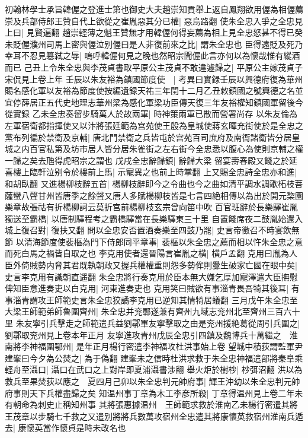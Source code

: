 初翰林學士承旨韓偓之登進士第也御史大夫趙崇知貢舉上返自鳳翔欲用偓為相偓薦崇及兵部侍郎王贊自代上欲從之崔胤惡其分已權|{
	惡烏路翻}
使朱全忠入爭之全忠見上曰|{
	見賢遍翻}
趙崇輕薄之魁王贊無才用韓偓何得妄薦為相上見全忠怒甚不得已癸未貶偓濮州司馬上密與偓泣别偓曰是人非復前來之比|{
	謂朱全忠也}
臣得遠貶及死乃幸耳不忍見簒弑之辱|{
	嗚呼韓偓何見之晚也然昭宗聞偓此言亦何以為懷哉惟有縱酒而已}
己丑上令朱全忠與李茂貞書取平原公主茂貞不敢違遽歸之|{
	平原公主嫁茂貞子宋侃見上卷上年}
壬辰以朱友裕為鎮國節度使　|{
	考異曰實録壬辰以興德府復為華州賜名感化軍以友裕為節度使按編遺録天祐三年閏十二月乙丑敕鎮國之號興德之名並宜停薛居正五代史地理志華州梁為感化軍梁功臣傳天復三年友裕權知鎮國軍留後今從實録}
乙未全忠奏留步騎萬人於故兩軍|{
	時神策兩軍已散而營署尚存}
以朱友倫為左軍宿衛都指揮使又以汴將張廷範為宫苑使王殷為皇城使蔣玄暉充街使於是全忠之黨布列徧於禁衛及京輔|{
	唐北門禁衛之兵皆屯於宫苑百司庶府及南衙諸衛皆分居皇城之内百官私第及坊市居人皆分居朱雀街之左右街今全忠悉以腹心為使則京輔之權一歸之矣去虺得虎昭宗之謂也}
戊戌全忠辭歸鎮|{
	辭歸大梁}
留宴壽春殿又餞之於延喜樓上臨軒泣别令於樓前上馬|{
	示寵異之也前上時掌翻}
上又賜全忠詩全忠亦和進|{
	和胡臥翻}
又進楊柳枝辭五首|{
	楊柳枝辭即今之令曲也今之曲如清平調水調歌柘枝菩薩蠻八聲甘州皆唐季之餘聲又唐人多賦楊柳枝皆是七言四絶相傳以為出於開元棃園樂章故張祜有折楊柳詞云莫折宫前楊柳枝玄宗曾向笛中吹}
百官班辭於長樂驛崔胤獨送至霸橋|{
	以唐制驛程考之霸橋驛當在長樂驛東三十里}
自置餞席夜二鼓胤始還入城上復召對|{
	復扶又翻}
問以全忠安否置酒奏樂至四鼓乃罷|{
	史言帝徵召不時宴飲無節}
以清海節度使裴樞為門下侍郎同平章事|{
	裴樞以朱全忠之薦而相以忤朱全忠之意而死白馬之禍皆自取之也}
李克用使者還晉陽言崔胤之横|{
	横戶孟翻}
克用曰胤為人臣外倚賊勢内脅其君既執朝政又握兵權權重則怨多勢侔則釁生破家亡國在眼中矣|{
	史言李克用有識朝直遥翻}
朱全忠將行奏克用於臣本無大嫌乞厚加寵澤遣大臣撫慰俾知臣意進奏吏以白克用|{
	河東進奏吏也}
克用笑曰賊欲有事淄青畏吾犄其後耳|{
	有事淄青謂攻王師範史言朱全忠狡譎李克用已逆知其情犄居蟻翻}
三月戊午朱全忠至大梁王師範弟師魯圍齊州|{
	朱全忠并兖鄆遂兼有齊州九域志兖州北至齊州三百六十里}
朱友寧引兵擊走之師範遣兵益劉鄩軍友寧擊取之由是兖州援絶葛從周引兵圍之|{
	劉鄩取兖州見上卷本年正月}
友寧進攻青州戊辰全忠引四鎮及魏博兵十萬繼之　淮南將李神福圍鄂州|{
	是年正月楊行密遣李神福攻杜洪事始上卷}
望城中積荻謂監軍尹建峯曰今夕為公焚之|{
	為于偽翻}
建峯未之信時杜洪求救于朱全忠神福遣部將秦臯乘輕舟至灄口|{
	灄口在武口之上對岸即夏浦灄書涉翻}
舉火炬於樹杪|{
	杪弭沼翻}
洪以為救兵至果焚荻以應之　夏四月己卯以朱全忠判元帥府事|{
	輝王沖幼以朱全忠判元帥府事則天下兵權盡歸之矣}
知温州事丁章為木工李彦所殺|{
	丁章得温州見上卷二年未有朝命為刺史止稱知州事}
其將張惠據温州　王師範求救於淮南乙未楊行密遣其將王茂章以步騎七千救之又遣别將將兵數萬攻宿州全忠遣其將康懷英救宿州淮南兵遁去|{
	康懷英當作懷貞是時未改名也}
